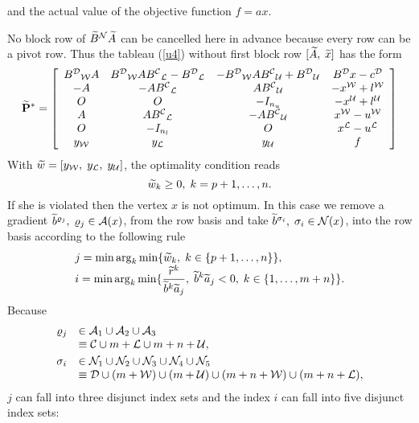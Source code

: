 and the actual value of the objective function $f = ax$.
\par
No block row of $\wi{B}^{\N}\wi{A}$ can be cancelled here in advance because
every row can be a pivot row.  Thus the tableau (\ref{u4}) without first block
row $[\wi{A}, \; \wi{x}]$ has the form
%
\begin{equation} \label{u12}
\wi{{\bf P}}^* =
\ba{[}{cccc}
B^{\D}{}_{\W}A & B^{\D}{}_{\W}AB^{\C}{}_{\L} - B^{\D}{}_{\L}
& - B^{\D}{}_{\W}AB^{\C}{}_{\U} + B^{\D}{}_{\U} & B^{\D}x - c^{\D}\\
- A & -AB^{\C}{}_{\L} &  AB^{\C}{}_{\U} & -x^{\W} + l^{\W}\\
O   &  O              & - I_{n_u}  &-x^{\U} + l^{\U}\\
A   & AB^{\C}{}_{\L}  &  - AB^{\C}{}_{\U} & x^{\W} - u^{\W}\\
O   & - I_{n_l}       &  O  & x^{\L} - u^{\L}\\
y_{\W} & y_{\L} & y_{\U} & f
\ea{]}
\end{equation}
%
With $\wi{w} = [y_{\W}, \; y_{\L}, \; y_{\U}]$, the optimality condition reads
\[
\wi{w}_k \geq 0, \; k = p+1, \ldots, n.
\]
If she is violated then the vertex $x$ is not optimum.  In this case we remove
a gradient $\wi{b}^{\rho _j}, \; \rho _j \in \A(x)$, from the row basis and
take $\wi{b}^{\sigma _i}, \; \sigma _i \in \N(x)$, into the row basis according
to the following rule
%
\begin{equation} \label{u13}
\ba{.}{l}
j = \min \arg_k \min \{ \wi{w}_k, \; k \in \{ p+1, \ldots, n \}\},\\
\dis i = \min \arg_k \min \{ \frac{\wi{r}^k}{\wi{b}^k\wi{a}_j},\;
\wi{b}^k\wi{a}_j < 0, \; k \in \{1, \ldots, m + n\} \}.
\ea{.}
\end{equation}
%
Because
\[
\ba{.}{ll}
\rho _j &\in \A_1 \cup \A_2 \cup \A_3 \\
        &\equiv \C \cup m + \L \cup m + n + \U,\\[1mm]
\sigma _i & \in \N_1 \cup \N_2 \cup \N_3 \cup \N_4 \cup \N_5\\
        & \equiv  \D \cup (m + \W) \cup (m + \U) \cup (m + n + \W) \cup (m + n
+ \L), \ea{.}
\]
$j$ can fall into three disjunct
index sets and the index $i$ can fall into five disjunct index sets:
